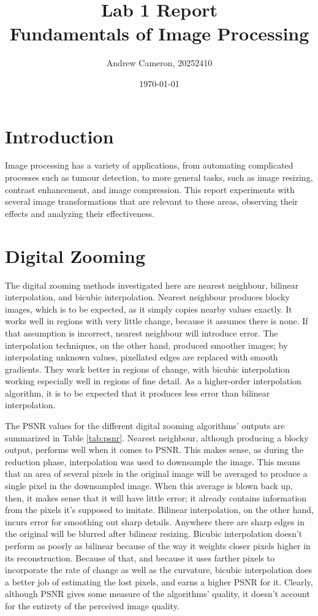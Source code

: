 \documentclass{sydeStyle}
\title{Lab 1 Report\\
Fundamentals of Image Processing}
\date{\today}
\author{Andrew Cameron, 20252410}
\begin{document}
\maketitle

\section*{Introduction}
Image processing has a variety of applications, from automating complicated
processes such as tumour detection, to more general tasks, such as image
resizing, contrast enhancement, and image compression.
This report experiments with several image transformations that are relevant to
these areas, observing their effects and analyzing their effectiveness.

\section*{Digital Zooming}
The digital zooming methods investigated here are nearest neighbour, bilinear interpolation, and bicubic interpolation.
Nearest neighbour produces blocky images, which is to be expected, as it simply copies nearby values exactly.
It works well in regions with very little change, because it assumes there is none.
If that assumption is incorrect, nearest neighbour will introduce error.
The interpolation techniques, on the other hand, produced smoother images; by interpolating unknown values, pixellated edges are replaced with smooth gradients.
They work better in regions of change, with bicubic interpolation working especially well in regions of fine detail.
As a higher-order interpolation algorithm, it is to be expected that it produces less error than bilinear interpolation.

The PSNR values for the different digital zooming algorithms' outputs are summarized in Table \ref{tab:psnr}.
Nearest neighbour, although producing a blocky output, performs well when it comes to PSNR.
This makes sense, as during the reduction phase, interpolation was used to downsample the image.
This means that an area of several pixels in the original image will be averaged to produce a single pixel in the downsampled image.
When this average is blown back up, then, it makes sense that it will have little error; it already contains information from the pixels it's supposed to imitate.
Bilinear interpolation, on the other hand, incurs error for smoothing out sharp details.
Anywhere there are sharp edges in the original will be blurred after bilinear resizing.
Bicubic interpolation doesn't perform as poorly as bilinear because of the way it weights closer pixels higher in its reconstruction.
Because of that, and because it uses farther pixels to incorporate the rate of change as well as the curvature, bicubic interpolation does a better job of estimating the lost pixels, and earns a higher PSNR for it.
Clearly, although PSNR gives some measure of the algorithms' quality, it doesn't account for the entirety of the perceived image quality.
\end{document}
